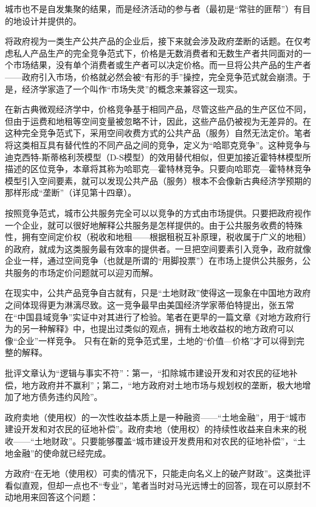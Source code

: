 城市也不是自发集聚的结果，而是经济活动的参与者（最初是“常驻的匪帮”）有目的地设计并提供的。

将政府视为一类生产公共产品的企业后，接下来就会涉及政府垄断的话题。在仅考虑私人产品生产的完全竞争范式下，价格是无数消费者和无数生产者共同面对的一个市场结果，没有单个消费者或生产者可以决定价格。而一旦将公共产品的生产者——政府引入市场，价格就必然会被“有形的手”操控，完全竞争范式就会崩溃。于是，经济学家造了一个叫作“市场失灵”的概念来兼容这一现实。

在新古典微观经济学中，价格竞争基于相同产品，尽管这些产品的生产区位不同，但由于运费和地租等空间变量被忽略不计，因此，这些产品仍被视为无差异的。在这种完全竞争范式下，采用空间收费方式的公共产品（服务）自然无法定价。笔者将这类相互具有替代性的不同产品之间的竞争，定义为“哈耶克竞争”。这种竞争与迪克西特-斯蒂格利茨模型（D-S模型）的效用替代相似，但更加接近霍特林模型所描述的区位竞争，本章将其称为哈耶克—霍特林竞争。只要向哈耶克—霍特林竞争模型引入空间要素，就可以发现公共产品（服务）根本不会像新古典经济学预期的那样形成“垄断”（详见第十四章）。

按照竞争范式，城市公共服务完全可以以竞争的方式由市场提供。只要把政府视作一个企业，就可以很好地解释公共服务是怎样提供的。由于公共服务收费的特殊性，拥有空间定价权（税收和地租——根据租税互补原理，税收属于广义的地租）的政府，就成为这类服务最有效率的提供者。一旦把空间要素引入竞争，政府就像企业一样，通过空间竞争（也就是所谓的“用脚投票”）在市场上提供公共服务，公共服务的市场定价问题就可以迎刃而解。

在现实中，公共产品竞争自古就有，只是“土地财政”使得这一现象在中国地方政府之间体现得更为淋漓尽致。这一竞争最早由美国经济学家蒂伯特提出，张五常在“中国县域竞争”实证中对其进行了检验。笔者在更早的一篇文章《对地方政府行为的另一种解释》中，也提出过类似的观点，拥有土地收益权的地方政府可以像“企业”一样竞争。
只有在新的竞争范式里，土地的“价值—价格”才可以得到完整的解释。

批评文章认为“逻辑与事实不符”：第一，“扣除城市建设开发和对农民的征地补偿，地方政府并不赢利”；第二，“地方政府对土地市场与规划权的垄断，极大地增加了地方债务违约风险”。

政府卖地（使用权）的一次性收益本质上是一种融资——“土地金融”，用于“城市建设开发和对农民的征地补偿”。政府卖地（使用权）的持续性收益来自未来的税收——“土地财政”。只要能够覆盖“城市建设开发费用和对农民的征地补偿”，“土地金融”的使命就已经完成。

方政府“在无地（使用权）可卖的情况下，只能走向名义上的破产财政”。这类批评看似直观，但却一点也不“专业”，笔者当时对马光远博士的回答，现在可以原封不动地用来回答这个问题：

